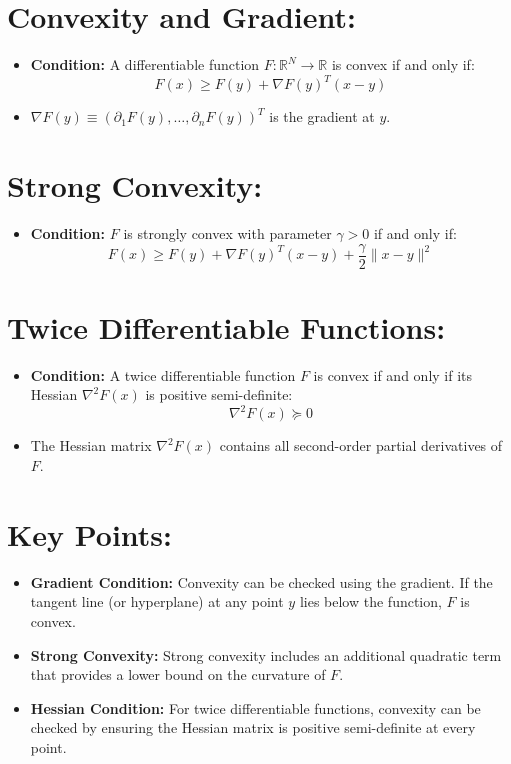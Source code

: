 \documentclass{article}
\begin{document}
\section*{Convexity and Gradient:}

\begin{itemize}
    \item \textbf{Condition:} A differentiable function $F : \mathbb{R}^N \rightarrow \mathbb{R}$ is convex if and only if:
    \[
    F(x) \geq F(y) + \nabla F(y)^T (x - y)
    \]
    \item $\nabla F(y) \equiv (\partial_1 F(y), \ldots, \partial_n F(y))^T$ is the gradient at $y$.
\end{itemize}

\section*{Strong Convexity:}

\begin{itemize}
    \item \textbf{Condition:} $F$ is strongly convex with parameter $\gamma > 0$ if and only if:
    \[
    F(x) \geq F(y) + \nabla F(y)^T (x - y) + \frac{\gamma}{2} \| x - y \|^2
    \]
\end{itemize}

\section*{Twice Differentiable Functions:}

\begin{itemize}
    \item \textbf{Condition:} A twice differentiable function $F$ is convex if and only if its Hessian $\nabla^2 F(x)$ is positive semi-definite:
    \[
    \nabla^2 F(x) \succeq 0
    \]
    \item The Hessian matrix $\nabla^2 F(x)$ contains all second-order partial derivatives of $F$.
\end{itemize}

\section*{Key Points:}

\begin{itemize}
    \item \textbf{Gradient Condition:} Convexity can be checked using the gradient. If the tangent line (or hyperplane) at any point $y$ lies below the function, $F$ is convex.
    \item \textbf{Strong Convexity:} Strong convexity includes an additional quadratic term that provides a lower bound on the curvature of $F$.
    \item \textbf{Hessian Condition:} For twice differentiable functions, convexity can be checked by ensuring the Hessian matrix is positive semi-definite at every point.
\end{itemize}
\end{document}
